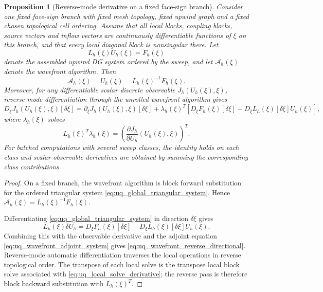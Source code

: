 \documentclass[10pt,a4paper]{amsart}
\newtheorem{proposition}{Proposition}
\newcommand{\qb}[1]{\ensuremath{\!\left[{#1}\right]}}
\newcommand{\qp}[1]{\ensuremath{\!\left({#1}\right)}}
\begin{document}
\begin{proposition}[Reverse-mode derivative on a fixed face-sign branch]
\label{prop:uq_reverse_mode_wavefront_adjoint}
Consider one fixed face-sign branch with fixed mesh topology, fixed
upwind graph and a fixed chosen topological cell ordering. Assume that
all local blocks, coupling blocks, source vectors and inflow vectors
are continuously differentiable functions of $\xi$ on this branch, and
that every local diagonal block is nonsingular there. Let
\begin{equation}
  L_h(\xi)U_h(\xi)=F_h(\xi)
  \label{eq:uq_global_triangular_system}
\end{equation}
denote the assembled upwind DG system ordered by the sweep, and let
$\mathcal{A}_h(\xi)$ denote the wavefront algorithm. Then
\begin{equation}
  \mathcal{A}_h(\xi)=U_h(\xi)=L_h(\xi)^{-1}F_h(\xi).
\end{equation}
Moreover, for any differentiable scalar discrete observable
$J_h(U_h(\xi),\xi)$, reverse-mode differentiation through the unrolled
wavefront algorithm gives
\begin{equation}
  D_\xi J_h(U_h(\xi),\xi)[\delta\xi]
  =
  \partial_\xi J_h(U_h(\xi),\xi)[\delta\xi]
  +
  \lambda_h(\xi)^T
  \qb{
    D_\xi F_h(\xi)[\delta\xi]
    -
    D_\xi L_h(\xi)[\delta\xi]U_h(\xi)
  },
  \label{eq:uq_wavefront_reverse_directional}
\end{equation}
where $\lambda_h(\xi)$ solves
\begin{equation}
  L_h(\xi)^T\lambda_h(\xi)
  =
  \qp{
    \frac{\partial J_h}{\partial U_h}(U_h(\xi),\xi)
  }^T.
  \label{eq:uq_wavefront_adjoint_system}
\end{equation}
For batched computations with several sweep classes, the identity holds
on each class and scalar observable derivatives are obtained by summing
the corresponding class contributions.
\end{proposition}

\begin{proof}
On a fixed branch, the wavefront algorithm is block forward
substitution for the ordered triangular system
\eqref{eq:uq_global_triangular_system}. Hence
$\mathcal{A}_h(\xi)=L_h(\xi)^{-1}F_h(\xi)$.

Differentiating \eqref{eq:uq_global_triangular_system} in direction
$\delta\xi$ gives
\begin{equation}
  L_h(\xi)\delta U_h
  =
  D_\xi F_h(\xi)[\delta\xi]
  -
  D_\xi L_h(\xi)[\delta\xi]U_h(\xi).
  \label{eq:uq_wavefront_forward_directional}
\end{equation}
Combining this with the observable derivative and the adjoint equation
\eqref{eq:uq_wavefront_adjoint_system} gives
\eqref{eq:uq_wavefront_reverse_directional}. Reverse-mode automatic
differentiation traverses the local operations in reverse topological
order. The transpose of each local solve is the transpose local block
solve associated with \eqref{eq:uq_local_solve_derivative}; the reverse
pass is therefore block backward substitution with $L_h(\xi)^T$.
\end{proof}
\end{document}
